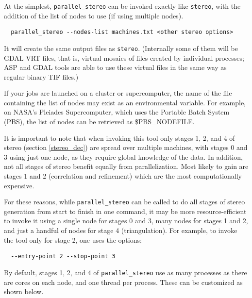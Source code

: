 At the simplest, \texttt{parallel\_stereo} can be invoked exactly like \texttt{stereo},
with the addition of the list of nodes to use (if using multiple nodes).

\begin{verbatim}
  parallel_stereo --nodes-list machines.txt <other stereo options>
\end{verbatim}

It will create the same output files as \texttt{stereo}. (Internally
some of them will be GDAL VRT files, that is, virtual mosaics of files created
by individual processes; ASP and GDAL tools are able to use these
virtual files in the same way as regular binary TIF files.)

If your jobs are launched on a cluster or supercomputer, the name of the
file containing the list of nodes may exist as an environmental
variable. For example, on NASA's Pleiades Supercomputer, which uses the
Portable Batch System (PBS), the list of nodes can be retrieved as
\$PBS\_NODEFILE.

It is important to note that when invoking this tool only stages 1, 2,
and 4 of stereo (section \ref{stereo_dec}) are spread over multiple
machines, with stages 0 and 3 using just one node, as they require
global knowledge of the data. In addition, not all stages of stereo
benefit equally from parallelization. Most likely to gain are stages 1
and 2 (correlation and refinement) which are the most computationally
expensive.

For these reasons, while \texttt{parallel\_stereo} can be called to do
all stages of stereo generation from start to finish in one command, it
may be more resource-efficient to invoke it using a single node for
stages 0 and 3, many nodes for stages 1 and 2, and just a handful of
nodes for stage 4 (triangulation). For example, to invoke the tool
only for stage 2, one uses the options:

\begin{verbatim}
  --entry-point 2 --stop-point 3
\end{verbatim}

By default, stages 1, 2, and 4 of \texttt{parallel\_stereo} use
as many processes as there are cores on each node, and one thread per process.
These can be customized as shown below.

